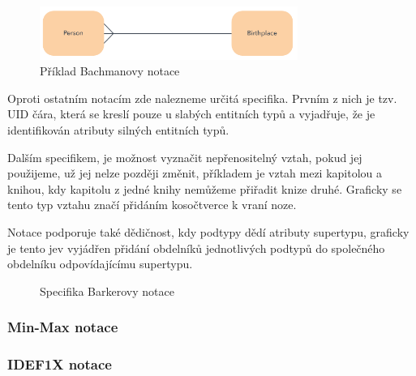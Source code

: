 \documentclass[czech,bachelor,public,dept460,male,oneside]{diploma}
\begin{document}
	\begin{figure}[!h]
		\centering
		\includegraphics[width=0.75\textwidth]{Figures/NotationExBarker}
		\caption[Příklad Bachmanovy notace]{Příklad Bachmanovy notace \cite{whatIsERD}}
	\end{figure}

	Oproti ostatním notacím zde nalezneme určitá specifika. Prvním z nich je tzv. UID čára, která se kreslí pouze u slabých entitních typů a vyjadřuje, že je identifikován atributy silných entitních typů. 
	
	Dalším specifikem, je možnost vyznačit nepřenositelný vztah, pokud jej použijeme, už jej nelze později změnit, příkladem je vztah mezi kapitolou a knihou, kdy kapitolu z jedné knihy nemůžeme přiřadit knize druhé. Graficky se tento typ vztahu značí přidáním kosočtverce k vraní noze.
	
	Notace podporuje také dědičnost, kdy podtypy dědí atributy supertypu, graficky je tento jev vyjádřen přidání obdelníků jednotlivých podtypů do společného obdelníku odpovídajícímu supertypu.
	
	\begin{figure}[!h]
		\centering
		\qquad
		\qquad
		\caption[Specifika Barkerovy notace]{Specifika Barkerovy notace \cite{verbateloBarker}}
	\end{figure}
	
	\subsubsection{Min-Max notace}
	
	\subsubsection{IDEF1X notace} \label{idef1x}
	
\end{document}
